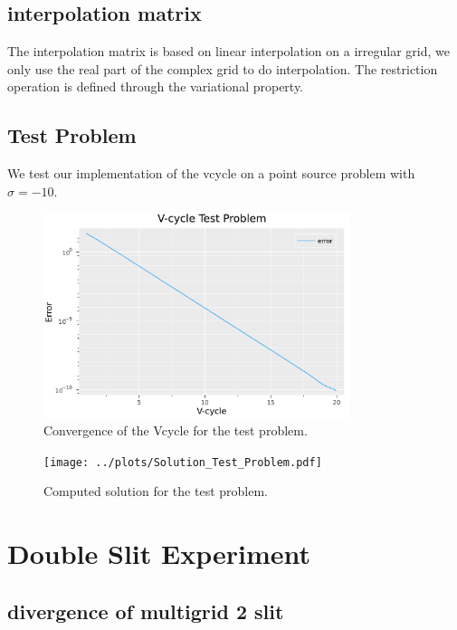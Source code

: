 \documentclass[a4paper,12pt]{article}
\begin{document}
\subsection{interpolation matrix}

The interpolation matrix is based on linear interpolation on a irregular grid, we only use
the real part of the complex grid to do interpolation. The restriction operation is defined
through the variational property.

\subsection{Test Problem}

We test our implementation of the vcycle on a point source problem with $\sigma = -10$.

\begin{figure}[h!]
    \centering
    \includegraphics[width=0.8\textwidth]{../plots/Vcycle_Test_Problem.pdf}
    \caption{Convergence of the Vcycle for the test problem.}
    \label{fig:../plots/Vcycle_Test_Problem.pdf}
\end{figure}

\begin{figure}[h!]
    \centering
    \texttt{[image: ../plots/Solution\_Test\_Problem.pdf]}
    \caption{Computed solution for the test problem.}
    \label{fig:Solution_Test_Problem}
\end{figure}

\section{Double Slit Experiment}
\subsection{divergence of multigrid 2 slit}
\end{document}
